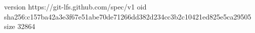 version https://git-lfs.github.com/spec/v1
oid sha256:c157ba42a3e3f67e51abe70de71266dd382d234cc3b2c10421ed825e5ca29505
size 32864
